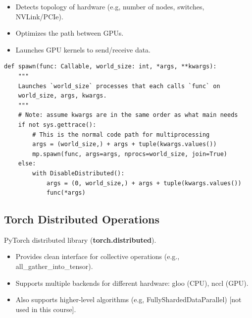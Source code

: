 \documentclass[12pt,twoside]{article}
\begin{document}
\begin{itemize}
    \item Detects topology of hardware (e.g, number of nodes, switches, NVLink/PCIe).
    \item Optimizes the path between GPUs.
    \item Launches GPU kernels to send/receive data.
\end{itemize}

\begin{verbatim}
def spawn(func: Callable, world_size: int, *args, **kwargs):
    """
    Launches `world_size` processes that each calls `func` on 
    world_size, args, kwargs.
    """
    # Note: assume kwargs are in the same order as what main needs
    if not sys.gettrace():
        # This is the normal code path for multiprocessing
        args = (world_size,) + args + tuple(kwargs.values())
        mp.spawn(func, args=args, nprocs=world_size, join=True)
    else:
        with DisableDistributed():  
            args = (0, world_size,) + args + tuple(kwargs.values())
            func(*args)
\end{verbatim}

\subsection*{Torch Distributed Operations}

PyTorch distributed library (\textbf{torch.distributed}).

\begin{itemize}
    \item Provides clean interface for collective operations (e.g., all\_gather\_into\_tensor).
    \item Supports multiple backends for different hardware: gloo (CPU), nccl (GPU).
    \item Also supports higher-level algorithms (e.g, FullyShardedDataParallel) [not used in this course].
\end{itemize}
\end{document}
